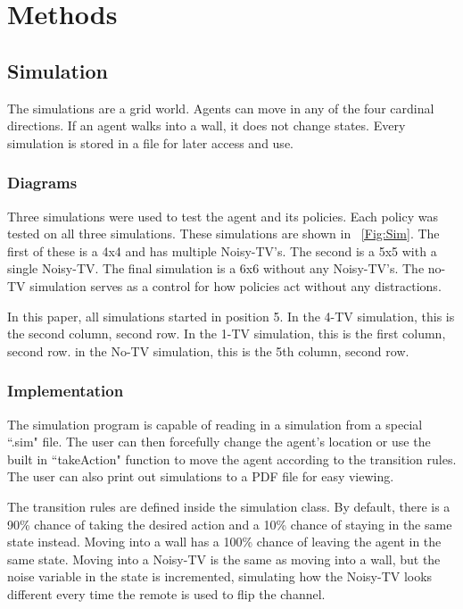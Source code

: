 \documentclass[12pt]{thesis}
\begin{document}

\chapter{Methods}
\section{Simulation}
The simulations are a grid world. Agents can move in any of the four cardinal directions. If an agent walks into a wall, it does not change states. Every simulation is stored in a file for later access and use.
\subsection{Diagrams}
Three simulations were used to test the agent and its policies. Each policy was tested on all three simulations. These simulations are shown in \figurename~\ref{Fig:Sim}. The first of these is a 4x4 and has multiple Noisy-TV's. The second is a 5x5 with a single Noisy-TV. The final simulation is a 6x6 without any Noisy-TV's. The no-TV simulation serves as a control for how policies act without any distractions.

In this paper, all simulations started in position 5. In the 4-TV simulation, this is the second column, second row. In the 1-TV simulation, this is the first column, second row. in the No-TV simulation, this is the 5th column, second row.
\subsection{Implementation}
The simulation program is capable of reading in a simulation from a special ``.sim" file. The user can then forcefully change the agent's location or use the built in ``takeAction" function to move the agent according to the transition rules. The user can also print out simulations to a PDF file for easy viewing.

The transition rules are defined inside the simulation class. By default, there is a 90\% chance of taking the desired action and a 10\% chance of staying in the same state instead. Moving into a wall has a 100\% chance of leaving the agent in the same state. Moving into a Noisy-TV is the same as moving into a wall, but the noise variable in the state is incremented, simulating how the Noisy-TV looks different every time the remote is used to flip the channel.
\end{document}
